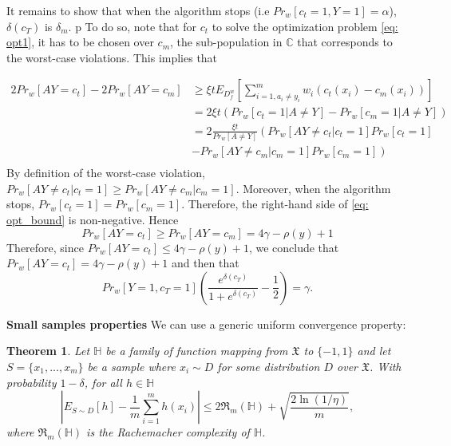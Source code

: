 \documentclass{article}
\newtheorem{thm}{Theorem}[section]
\begin{document}
\bigskip
It remains to show that when the algorithm stops (i.e $Pr_{w}[c_{t}=1, Y=1] = \alpha$), $\delta(c_{T})$ is $\delta_{m}$. p
To do so, note that for $c_{t}$ to solve the optimization problem \eqref{eq: opt1}, it has to be chosen over $c_{m}$, the sub-population in $\mathbb{C}$ that corresponds to the worst-case violations. This implies that

\begin{equation}
\label{eq: opt_bound}
\begin{split}
2Pr_{w}[AY=c_{t}] - 2Pr_{w}[AY=c_{m}] &\geq \xi t E_{D_{f}^{w}}\left[\displaystyle\sum_{i=1, a_{i}\neq y_{i} }^{m} w_{i}(c_{t}(x_{i})-c_{m}(x_{i})) \right] \\
& = 2\xi t \left(Pr_{w}[c_{t}=1|A\neq Y] - Pr_{w}[c_{m}=1|A\neq Y]\right)\\
& =2 \frac{\xi t }{Pr_{w}[A\neq Y]}  \left(Pr_{w}[AY\neq c_{t}|c_{t}=1]Pr_{w}[c_{t}=1] \right.\\
&- \left. Pr_{w}[AY\neq c_{m}|c_{m}=1]Pr_{w}[c_{m}=1] \right)\\
\end{split}
\end{equation}
By definition of the worst-case violation, $Pr_{w}[AY\neq c_{t}|c_{t}=1] \geq Pr_{w}[AY\neq c_{m}|c_{m}=1]$. Moreover, when the algorithm stops, $Pr_{w}[c_{t}=1]=Pr_{w}[c_{m}=1]$. Therefore, the right-hand side of \eqref{eq: opt_bound} is non-negative. Hence 
\begin{equation}
Pr_{w}[AY=c_{t}] \geq Pr_{w}[AY=c_{m}] = 4\gamma -\rho(y) + 1
\end{equation}
 Therefore, since $Pr_{w}[AY=c_{t}] \leq 4\gamma -\rho(y) + 1$, we conclude that $Pr_{w}[AY=c_{t}] = 4\gamma -\rho(y) + 1$ and then that 
 \begin{equation}
Pr_{w}[Y=1,c_{T}=1]\left(\frac{e^{\delta(c_{T})}}{1 + e^{\delta(c_{T})}}-\frac{1}{2}\right)=\gamma.
 \end{equation}

\bigskip
\textbf{Small samples properties}
We can use a generic uniform convergence property: 

\begin{thm}
	\label{thm1}
	Let $\mathbb{H}$ be a family of function  mapping from $\mathfrak{X}$ to $\{-1, 1\}$ and let $S=\{x_{1}, ..., x_{m}\}$ be a sample where $x_{i}\sim D$ for some distribution $D$ over $\mathfrak{X}$. With probability $1-\delta$, for all $h\in \mathbb{H}$
	$$  \left|E_{S\sim D}[h]- \frac{1}{m}\displaystyle\sum_{i=1}^{m} h(x_{i})\right| \leq 2\mathfrak{R}_{m}(\mathbb{H}) + \sqrt{\frac{2\ln(1/\eta)}{m}},$$
	where $\mathfrak{R}_{m}(\mathbb{H})$ is the Rachemacher complexity of $\mathbb{H}$.
\end{thm}
\end{document}
